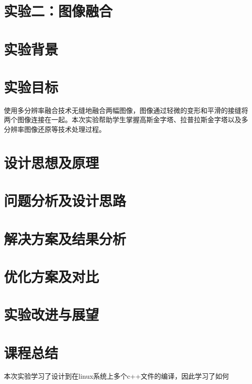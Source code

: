 \documentclass[withoutpreface,bwprint]{cumcmthesis} %
\begin{document}
\newpage

\section*{\LARGE 实验二：图像融合}

\section{实验背景}
\section{实验目标}
使用多分辨率融合技术无缝地融合两幅图像，图像通过轻微的变形和平滑的接缝将两个图像连接在一起。本次实验帮助学生掌握高斯金字塔、拉普拉斯金字塔以及多分辨率图像还原等技术处理过程。
\section{设计思想及原理}

\section{问题分析及设计思路}


\section{解决方案及结果分析}

\section{优化方案及对比}


\section{实验改进与展望}



\section{课程总结}
本次实验学习了设计到在linux系统上多个c++文件的编译，因此学习了如何
\end{document}
